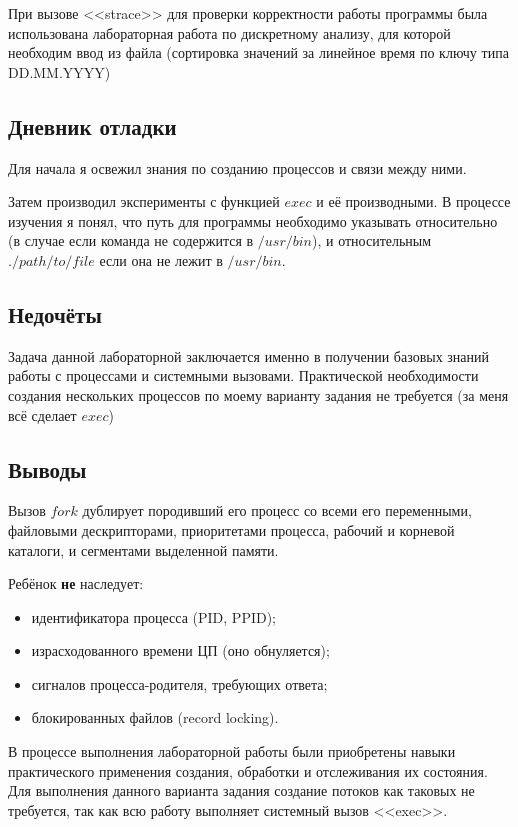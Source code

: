 \documentclass[12pt]{article}
\begin{document}
При вызове <<strace>> для проверки корректности работы программы была использована лабораторная работа по дискретному анализу, для которой необходим ввод из файла (сортировка значений за линейное время по ключу типа DD.MM.YYYY)

\subsection*{Дневник отладки}  

Для начала я освежил знания по созданию процессов и связи между ними.

Затем производил эксперименты с функцией $exec$ и её производными.
В процессе изучения я понял, что путь для программы необходимо указывать относительно (в случае если команда не содержится в $/usr/bin$), и относительным $./path/to/file$ если она не лежит в $/usr/bin$.

\subsection*{Недочёты}

Задача данной лабораторной заключается именно в получении базовых знаний работы с процессами и системными вызовами. Практической необходимости создания нескольких процессов по моему варианту задания не требуется (за меня всё сделает $exec$)

\subsection*{Выводы}

Вызов $fork$ дублирует породивший его процесс со всеми его переменными, файловыми дескрипторами, приоритетами процесса, рабочий и корневой каталоги, и сегментами выделенной памяти.

Ребёнок {\bf не} наследует:
\begin{itemize}
    \item идентификатора процесса (PID, PPID);
    \item израсходованного времени ЦП (оно обнуляется);
    \item сигналов процесса-родителя, требующих ответа;
    \item блокированных файлов (record locking).
\end{itemize}

В процессе выполнения лабораторной работы были приобретены навыки практического применения создания, обработки и отслеживания их состояния. Для выполнения данного варианта задания создание потоков как таковых не требуется, так как всю работу выполняет системный вызов <<exec>>.
\end{document}
